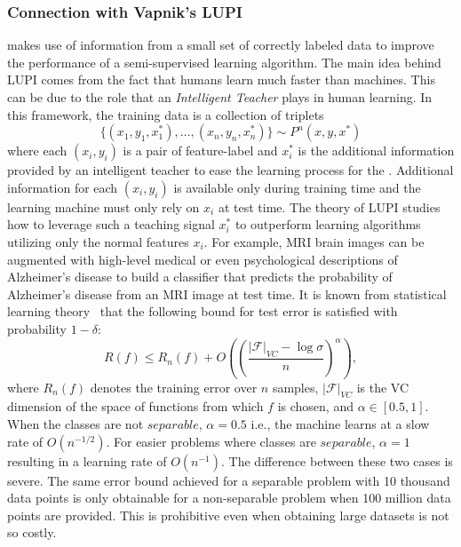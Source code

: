 \subsubsection{Connection with Vapnik's LUPI}
\label{sec:LUPI}
\fwl makes use of information from a small set of correctly labeled data to improve the performance of a semi-supervised learning algorithm. The main idea behind LUPI comes from the fact that humans learn much faster than machines. This can be due to the role that an \emph{Intelligent Teacher} plays in human learning. In this framework, the training data is a collection of triplets
\begin{equation}
    \{(x_1, y_1, x_1^*),\ldots,(x_n,y_n,x_n^*)\}\mathtt{\sim}P^n(x,y,x^*)
\end{equation}
where each ${(x_i,y_i)}$ is a pair of feature-label and $x_i^*$ is the additional information provided by an intelligent teacher to ease the learning process for the \std. Additional information for each ${(x_i,y_i)}$ is available only during training time and the learning machine must only rely on $x_i$ at test time. The theory of LUPI studies how to leverage such a teaching signal $x_i^*$ to outperform learning algorithms utilizing only the normal features $x_i$. For example, MRI brain images can be augmented with high-level medical or even psychological descriptions of Alzheimer's disease to build a classifier that predicts the probability of Alzheimer's disease from an MRI image at test time.
It is known from statistical learning theory~\citep{Vapnik1998} that the following bound for test error is satisfied with probability $1-\delta$:
\begin{equation}
\label{eq:LUPI_error_bound}
    R(f) \leq R_n(f) + O\left(\left(\frac{|\mathcal{F}|_{VC}-\log \sigma}{n}\right)^\alpha\right),
\end{equation}
where $R_n(f)$ denotes the training error over $n$ samples, $|\mathcal{F}|_{VC}$ is the VC dimension of the space of functions from which $f$ is chosen, and $\alpha \in [0.5,1]$. When the classes are not $separable$, $\alpha = 0.5$ i.e., the machine learns at a slow rate of $O(n^{-1/2})$. For easier problems where classes are $separable$, $\alpha=1$ resulting in a learning rate of $O(n^{-1})$.  The difference between these two cases is severe. The same error bound achieved for a separable problem with 10 thousand data points is only obtainable for a non-separable problem when 100 million data points are provided. This is prohibitive even when obtaining large datasets is not so costly. 

